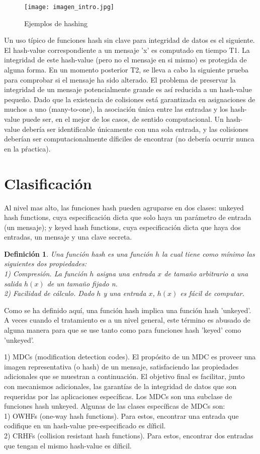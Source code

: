 \documentclass[a4paper, 12pt]{article} %
\newtheorem*{mydef1}{Definición} %
\begin{document}
\newpage
\begin{figure}[h!]
	    \centering
	    \texttt{[image: imagen\_intro.jpg]}
	    \caption{Ejemplos de hashing}
	    \label{fig:Ejemplos_hashing}
\end{figure}

Un uso típico de funciones hash sin clave para integridad de datos es el siguiente. El hash-value
correspondiente a un mensaje 'x' es computado en tiempo T1. La integridad de este hash-value
(pero no el mensaje en si mismo) es protegida de alguna forma. En un momento posterior T2, se
lleva a cabo la siguiente prueba para comprobar si el mensaje ha sido alterado. El problema
de preservar la integridad de un mensaje potencialmente grande es así reducida a un hash-value
pequeño. Dado que la existencia de colisiones está garantizada en asignaciones de muchos a uno
(many-to-one), la asociación única entre las entradas y los hash-value puede ser, en el mejor
de los casos, de sentido computacional. Un hash-value debería ser identificable únicamente con
una sola entrada, y las colisiones deberían ser computacionalmente díficiles de encontrar (no
debería ocurrir nunca en la pŕactica).

\newpage
\section{Clasificación}
Al nivel mas alto, las funciones hash pueden agruparse en dos clases: unkeyed hash functions,
cuya especificación dicta que solo haya un parámetro de entrada (un mensaje); y keyed
hash functions, cuya especificación dicta que haya dos entradas, un mensaje y una clave secreta.

\begin{mydef1}
Una función hash es una función $h$ la cual tiene como mínimo las siguientes dos
propiedades:\\ 1) Compresión. La función $h$ asigna una entrada $x$ de tamaño arbitrario a una
salida $h(x)$ de un tamaño fijado n.\\
2) Facilidad de cálculo. Dado $h$ y una entrada $x$, $h(x)$ es fácil de computar.
\end{mydef1}

Como se ha definido aquí, una función hash implica una función hash 'unkeyed'. A veces
cuando el tratamiento es a un nivel general, este término es abusado de alguna manera
para que se use tanto como para funciones hash 'keyed' como 'unkeyed'.

1) MDCs (modification detection codes).
El propósito de un MDC es proveer una imagen representativa (o hash) de un mensaje, satisfaciendo
las propiedades adicionales que se muestran a continuación. El objetivo final es facilitar,
junto con mecanismos adicionales, las garantías de la integridad de datos que son requeridas por
las aplicaciones específicas. Los MDCs son una subclase de funciones hash unkeyed. Algunas de
las clases específicas de MDCs son:\\
1) OWHFs (one-way hash functions). Para estos, encontrar una entrada que codifique en un hash-value
pre-especificado es díficil.\\
2) CRHFs (collision resistant hash functions). Para estos, encontrar dos entradas que tengan el
mismo hash-value es díficil.
\end{document}
